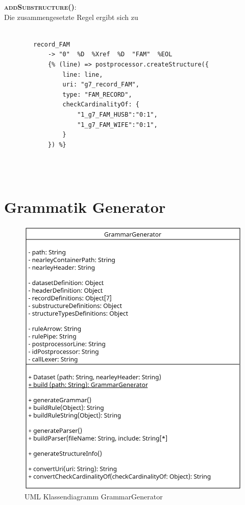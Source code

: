 \vspace{1em}
\textsc{\textbf{addSubstructure()}:} \vspace{0.5em} \\
Die zusammengesetzte Regel ergibt sich zu 
\\ \\
\begin{minipage}{1.0\textwidth} \small
	\begin{lstlisting}
		record_FAM
			-> "0"  %D  %Xref  %D  "FAM"  %EOL
			{% (line) => postprocessor.createStructure({
				line: line,
				uri: "g7_record_FAM", 
				type: "FAM_RECORD", 
				checkCardinalityOf: {
					"1_g7_FAM_HUSB":"0:1", 
					"1_g7_FAM_WIFE":"0:1",
				}
			}) %}
	\end{lstlisting}
	\label{lst: nearley regel family record mit postprozessor und substructs}
\end{minipage}
\\ \\

\section{Grammatik Generator}
\label{sec: Implementierung - Grammatik Generator}
\begin{figure}[h]
	\centering
	\includegraphics[width=1\textwidth]{images/UML_Class_GrammarGenerator.png}
	\caption{UML Klassendiagramm GrammarGenerator}
	\label{fig: UML Klassendiagramm GrammarGenerator}
\end{figure}

